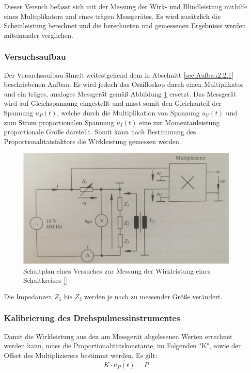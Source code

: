 Dieser Versuch befasst sich mit der Messung der Wirk- und Blindleistung mithilfe eines Multiplikators und eines trägen Messgerätes. Es wird zusätzlich die Scheinleistung berechnet und die berechneten und gemessenen Ergebnisse werden miteinander verglichen.

\subsubsection{Versuchsaufbau}

Der Versuchsaufbau ähnelt weitestgehend dem in Abschnitt \ref{sec:Aufbau2.2.1} beschriebenen Aufbau. Es wird jedoch das Oszilloskop durch einen Multiplikator und ein träges, analoges Messgerät gemäß Abbildung \ref{fig:Plan2-2} ersetzt. Das Messgerät wird auf Gleichspannung eingestellt und misst somit den Gleichanteil der Spannung $u_P(t)$, welche durch die Multiplikation von Spannung $u_U(t)$ und zum Strom proportionalen Spannung $u_I(t)$ eine zur Momentanleistung proportionale Größe darstellt. Somit kann nach Bestimmung des Proportionalitätsfaktors die Wirkleistung gemessen werden.

\begin{figure}[H]
\centering
\includegraphics[width=0.7\linewidth]{Images/Aufbau2-2.png}
\caption{Schaltplan eines Versuches zur Messung der Wirkleistung eines Schaltkreises [\cite[49]{GEMLBuch}]}
\label{fig:Plan2-2}
\end{figure}
Die Impedanzen $Z_1$ bis $Z_3$ werden je nach zu messender Größe verändert.

\subsubsection{Kalibrierung des Drehspulmessinstrumentes}
Damit die Wirkleistung aus den am Messgerät abgelesenen Werten errechnet werden kann, muss die Proportionalitätskonstante, im Folgenden "K", sowie der Offset des Multiplizierers bestimmt werden.
Es gilt:
\begin{equation}
K\cdot \overline{u_P(t)} = P
\label{eq:PropFaktor}
\end{equation}


